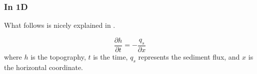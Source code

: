 
\subsubsection{In 1D} 

What follows is nicely explained in \cite{anpa19}. 


\[
\frac{\partial h}{\partial t} = -\frac{q_s}{\partial x}
\]
where $h$ is the topography, $t$ is the time, $q_s$ represents the sediment flux, 
and $x$ is the horizontal coordinate. 
